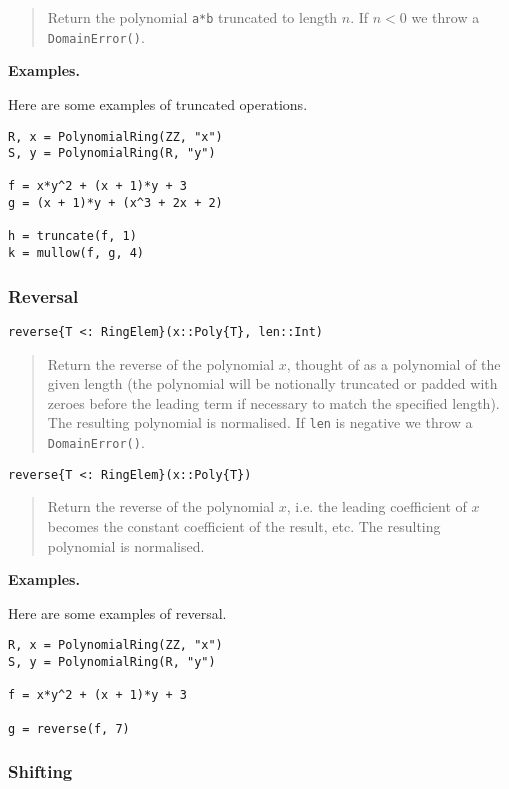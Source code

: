 \documentclass[a4paper,10pt]{article}
\newcommand{\code}{\lstinline}
\newcommand{\desc}[1]{\vspace{-3mm}\begin{quote}#1\end{quote}}
\begin{document}
\desc{Return the polynomial \code{a*b} truncated to length $n$. If $n < 0$ we
throw a \code{DomainError()}.}

\textbf{Examples.}

Here are some examples of truncated operations.

\begin{lstlisting}
R, x = PolynomialRing(ZZ, "x")
S, y = PolynomialRing(R, "y")

f = x*y^2 + (x + 1)*y + 3
g = (x + 1)*y + (x^3 + 2x + 2)

h = truncate(f, 1)
k = mullow(f, g, 4)
\end{lstlisting}

\subsubsection{Reversal}

\begin{lstlisting}
reverse{T <: RingElem}(x::Poly{T}, len::Int)
\end{lstlisting}

\desc{Return the reverse of the polynomial $x$, thought of as a polynomial of
the given length (the polynomial will be notionally truncated or padded with
zeroes before the leading term if necessary to match the specified length). 
The resulting polynomial is normalised. If \code{len} is negative we throw a
\code{DomainError()}.}

\begin{lstlisting}
reverse{T <: RingElem}(x::Poly{T})
\end{lstlisting}

\desc{Return the reverse of the polynomial $x$, i.e. the leading coefficient
of $x$ becomes the constant coefficient of the result, etc. The resulting
polynomial is normalised.}

\textbf{Examples.}

Here are some examples of reversal.

\begin{lstlisting}
R, x = PolynomialRing(ZZ, "x")
S, y = PolynomialRing(R, "y")

f = x*y^2 + (x + 1)*y + 3

g = reverse(f, 7)
\end{lstlisting}

\subsubsection{Shifting}
\end{document}
